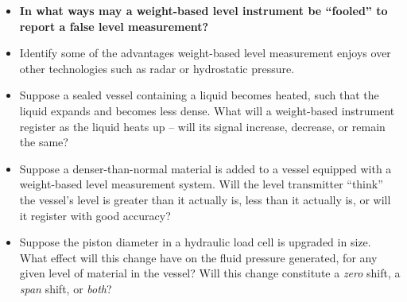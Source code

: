 \begin{itemize}
\item{} {\bf In what ways may a weight-based level instrument be ``fooled'' to report a false level measurement?}
\item{} Identify some of the advantages weight-based level measurement enjoys over other technologies such as radar or hydrostatic pressure.
\item{} Suppose a sealed vessel containing a liquid becomes heated, such that the liquid expands and becomes less dense.  What will a weight-based instrument register as the liquid heats up -- will its signal increase, decrease, or remain the same?
\item{} Suppose a denser-than-normal material is added to a vessel equipped with a weight-based level measurement system.  Will the level transmitter ``think'' the vessel's level is greater than it actually is, less than it actually is, or will it register with good accuracy?
\item{} Suppose the piston diameter in a hydraulic load cell is upgraded in size.  What effect will this change have on the fluid pressure generated, for any given level of material in the vessel?  Will this change constitute a {\it zero} shift, a {\it span} shift, or {\it both}?
\end{itemize}




